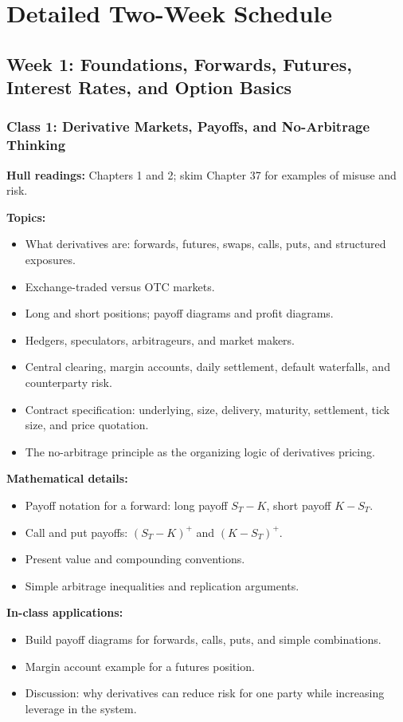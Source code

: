 \documentclass[11pt]{article}
\begin{document}
\section*{Detailed Two-Week Schedule}

\subsection*{Week 1: Foundations, Forwards, Futures, Interest Rates, and Option Basics}

\subsubsection*{Class 1: Derivative Markets, Payoffs, and No-Arbitrage Thinking}
\textbf{Hull readings:} Chapters 1 and 2; skim Chapter 37 for examples of misuse and risk.

\textbf{Topics:}
\begin{itemize}
    \item What derivatives are: forwards, futures, swaps, calls, puts, and structured exposures.
    \item Exchange-traded versus OTC markets.
    \item Long and short positions; payoff diagrams and profit diagrams.
    \item Hedgers, speculators, arbitrageurs, and market makers.
    \item Central clearing, margin accounts, daily settlement, default waterfalls, and counterparty risk.
    \item Contract specification: underlying, size, delivery, maturity, settlement, tick size, and price quotation.
    \item The no-arbitrage principle as the organizing logic of derivatives pricing.
\end{itemize}

\textbf{Mathematical details:}
\begin{itemize}
    \item Payoff notation for a forward: long payoff $S_T-K$, short payoff $K-S_T$.
    \item Call and put payoffs: $(S_T-K)^+$ and $(K-S_T)^+$.
    \item Present value and compounding conventions.
    \item Simple arbitrage inequalities and replication arguments.
\end{itemize}

\textbf{In-class applications:}
\begin{itemize}
    \item Build payoff diagrams for forwards, calls, puts, and simple combinations.
    \item Margin account example for a futures position.
    \item Discussion: why derivatives can reduce risk for one party while increasing leverage in the system.
\end{itemize}
\end{document}
